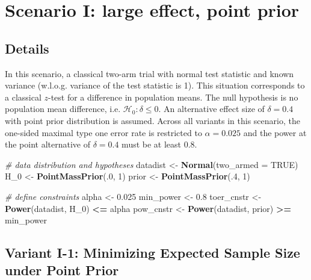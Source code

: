 \documentclass[
]{book}
\newenvironment{Shaded}{\begin{snugshade}}{\end{snugshade}}
\newcommand{\CommentTok}[1]{\textcolor[rgb]{0.56,0.35,0.01}{\textit{#1}}}
\newcommand{\DataTypeTok}[1]{\textcolor[rgb]{0.13,0.29,0.53}{#1}}
\newcommand{\DecValTok}[1]{\textcolor[rgb]{0.00,0.00,0.81}{#1}}
\newcommand{\FloatTok}[1]{\textcolor[rgb]{0.00,0.00,0.81}{#1}}
\newcommand{\KeywordTok}[1]{\textcolor[rgb]{0.13,0.29,0.53}{\textbf{#1}}}
\newcommand{\NormalTok}[1]{#1}
\newcommand{\OperatorTok}[1]{\textcolor[rgb]{0.81,0.36,0.00}{\textbf{#1}}}
\newcommand{\OtherTok}[1]{\textcolor[rgb]{0.56,0.35,0.01}{#1}}
\newcommand{\StringTok}[1]{\textcolor[rgb]{0.31,0.60,0.02}{#1}}
\begin{document}
\hypertarget{scenarioI}{%
\chapter{Scenario I: large effect, point prior}\label{scenarioI}}

\hypertarget{details}{%
\section{Details}\label{details}}

In this scenario, a classical two-arm trial with normal
test statistic and known variance (w.l.o.g. variance of
the test statistic is 1).
This situation corresponds to a classical \(z\)-test for
a difference in population means.
The null hypothesis is no population mean difference, i.e.
\(\mathcal{H}_0:\delta \leq 0\).
An alternative effect size of \(\delta = 0.4\) with
point prior distribution is assumed.
Across all variants in this scenario, the one-sided maximal
type one error rate is restricted to \(\alpha=0.025\)
and the power at the point alternative of \(\delta=0.4\) must
be at least \(0.8\).

\begin{Shaded}
\begin{Highlighting}[]
\CommentTok{# data distribution and hypotheses}
\NormalTok{datadist   <-}\StringTok{ }\KeywordTok{Normal}\NormalTok{(}\DataTypeTok{two_armed =} \OtherTok{TRUE}\NormalTok{)}
\NormalTok{H_}\DecValTok{0}\NormalTok{        <-}\StringTok{ }\KeywordTok{PointMassPrior}\NormalTok{(.}\DecValTok{0}\NormalTok{, }\DecValTok{1}\NormalTok{)}
\NormalTok{prior      <-}\StringTok{ }\KeywordTok{PointMassPrior}\NormalTok{(.}\DecValTok{4}\NormalTok{, }\DecValTok{1}\NormalTok{)}

\CommentTok{# define constraints}
\NormalTok{alpha      <-}\StringTok{ }\FloatTok{0.025}
\NormalTok{min_power  <-}\StringTok{ }\FloatTok{0.8}
\NormalTok{toer_cnstr <-}\StringTok{ }\KeywordTok{Power}\NormalTok{(datadist, H_}\DecValTok{0}\NormalTok{)   }\OperatorTok{<=}\StringTok{ }\NormalTok{alpha}
\NormalTok{pow_cnstr  <-}\StringTok{ }\KeywordTok{Power}\NormalTok{(datadist, prior) }\OperatorTok{>=}\StringTok{ }\NormalTok{min_power}
\end{Highlighting}
\end{Shaded}

\hypertarget{variantI_1}{%
\section{Variant I-1: Minimizing Expected Sample Size under Point Prior}\label{variantI_1}}
\end{document}
